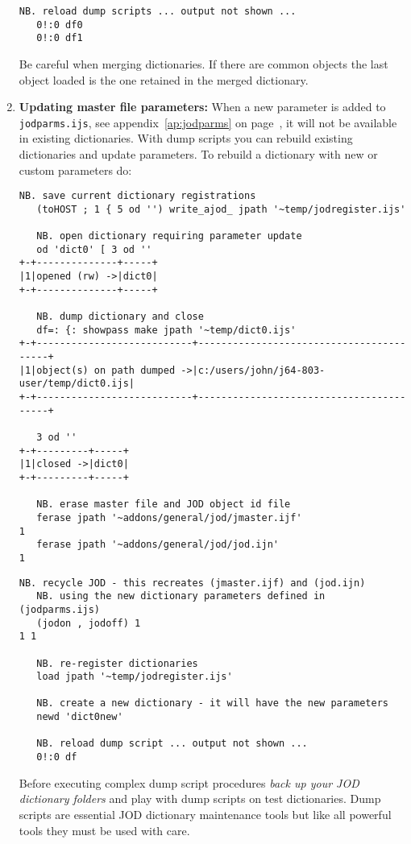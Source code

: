 \begin{enumerate}
\begin{lstlisting}[frame=single,framerule=0pt,basicstyle=\ttfamily\footnotesize]
   NB. reload dump scripts ... output not shown ...  
   0!:0 df0  
   0!:0 df1
\end{lstlisting}

Be careful when merging dictionaries. If there are common objects the last object loaded is the one
retained in the merged dictionary.


\item \textbf{Updating master file parameters:} When a new parameter is added to \texttt{jodparms.ijs}, 
see appendix~\ref{ap:jodparms} on page~\pageref{ap:jodparms}, it will not be available in existing dictionaries.
With dump scripts you can rebuild existing dictionaries and update parameters. To rebuild a dictionary with
new or custom parameters do:

\begin{lstlisting}[frame=single,framerule=0pt,basicstyle=\ttfamily\footnotesize]
   NB. save current dictionary registrations
   (toHOST ; 1 { 5 od '') write_ajod_ jpath '~temp/jodregister.ijs'
   
   NB. open dictionary requiring parameter update 
   od 'dict0' [ 3 od ''
+-+--------------+-----+
|1|opened (rw) ->|dict0|
+-+--------------+-----+
   
   NB. dump dictionary and close
   df=: {: showpass make jpath '~temp/dict0.ijs'
+-+---------------------------+-----------------------------------------+
|1|object(s) on path dumped ->|c:/users/john/j64-803-user/temp/dict0.ijs|
+-+---------------------------+-----------------------------------------+

   3 od ''
+-+---------+-----+
|1|closed ->|dict0|
+-+---------+-----+

   NB. erase master file and JOD object id file
   ferase jpath '~addons/general/jod/jmaster.ijf'
1
   ferase jpath '~addons/general/jod/jod.ijn'
1
\end{lstlisting}

\newpage

\begin{lstlisting}[frame=single,framerule=0pt,basicstyle=\ttfamily\footnotesize]
   NB. recycle JOD - this recreates (jmaster.ijf) and (jod.ijn) 
   NB. using the new dictionary parameters defined in (jodparms.ijs)   
   (jodon , jodoff) 1
1 1

   NB. re-register dictionaries
   load jpath '~temp/jodregister.ijs'

   NB. create a new dictionary - it will have the new parameters
   newd 'dict0new'
   
   NB. reload dump script ... output not shown ...
   0!:0 df  
\end{lstlisting}

Before executing complex dump script procedures \emph{back up your JOD dictionary folders} and play with 
dump scripts on test dictionaries. Dump scripts are essential JOD dictionary maintenance tools but like
all powerful tools they must be used with care. 


\end{enumerate} 

